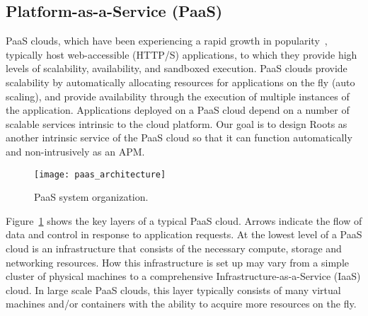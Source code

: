 \subsection{Platform-as-a-Service (PaaS)}

PaaS clouds, which have been experiencing a rapid growth in 
popularity~\cite{paas-growth,paas-growth2},
typically host web-accessible (HTTP/S) applications, to which they provide
high levels of scalability, availability, and sandboxed execution. PaaS
clouds provide scalability by automatically allocating resources for
applications on the fly (auto scaling), and provide availability through the
execution of multiple instances of the application. Applications deployed on
a PaaS cloud depend on a number of scalable services intrinsic to the 
cloud platform. Our goal is to design Roots as another intrinsic service of the PaaS cloud
so that it can function automatically and non-intrusively as an APM.

\begin{figure}
\centering
\texttt{[image: paas\_architecture]}
\caption{PaaS system organization.}
\label{fig:paas_architecture}
\end{figure}

Figure~\ref{fig:paas_architecture} shows the key layers of a typical PaaS cloud. Arrows indicate
the flow of data and control in response to application requests.
At the lowest level of a PaaS cloud is an infrastructure that consists of the necessary compute, storage
and networking resources. How this infrastructure is set up may vary from a simple cluster of physical 
machines to a comprehensive Infrastructure-as-a-Service (IaaS) cloud. In large scale PaaS clouds,
this layer typically consists of many virtual machines and/or containers with the ability to acquire more
resources on the fly.

